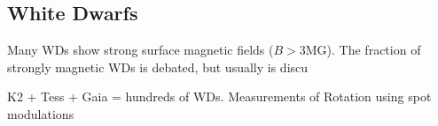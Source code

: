{\color{red} \subsection{White Dwarfs}}
Many WDs show strong surface magnetic fields ($B>$3MG). The fraction of strongly magnetic WDs is debated, but usually is discu 

K2 + Tess + Gaia = hundreds of WDs. Measurements of Rotation using spot modulations